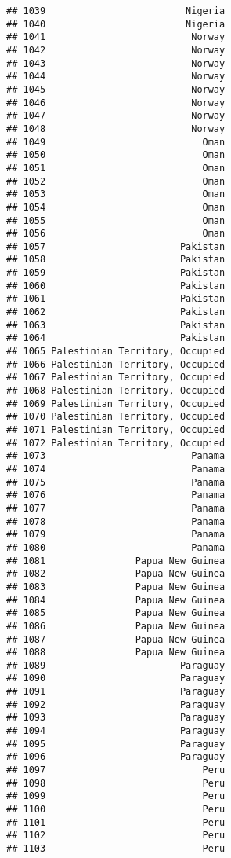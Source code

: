 \documentclass[]{article}
\begin{document}
\begin{verbatim}
## 1039                         Nigeria
## 1040                         Nigeria
## 1041                          Norway
## 1042                          Norway
## 1043                          Norway
## 1044                          Norway
## 1045                          Norway
## 1046                          Norway
## 1047                          Norway
## 1048                          Norway
## 1049                            Oman
## 1050                            Oman
## 1051                            Oman
## 1052                            Oman
## 1053                            Oman
## 1054                            Oman
## 1055                            Oman
## 1056                            Oman
## 1057                        Pakistan
## 1058                        Pakistan
## 1059                        Pakistan
## 1060                        Pakistan
## 1061                        Pakistan
## 1062                        Pakistan
## 1063                        Pakistan
## 1064                        Pakistan
## 1065 Palestinian Territory, Occupied
## 1066 Palestinian Territory, Occupied
## 1067 Palestinian Territory, Occupied
## 1068 Palestinian Territory, Occupied
## 1069 Palestinian Territory, Occupied
## 1070 Palestinian Territory, Occupied
## 1071 Palestinian Territory, Occupied
## 1072 Palestinian Territory, Occupied
## 1073                          Panama
## 1074                          Panama
## 1075                          Panama
## 1076                          Panama
## 1077                          Panama
## 1078                          Panama
## 1079                          Panama
## 1080                          Panama
## 1081                Papua New Guinea
## 1082                Papua New Guinea
## 1083                Papua New Guinea
## 1084                Papua New Guinea
## 1085                Papua New Guinea
## 1086                Papua New Guinea
## 1087                Papua New Guinea
## 1088                Papua New Guinea
## 1089                        Paraguay
## 1090                        Paraguay
## 1091                        Paraguay
## 1092                        Paraguay
## 1093                        Paraguay
## 1094                        Paraguay
## 1095                        Paraguay
## 1096                        Paraguay
## 1097                            Peru
## 1098                            Peru
## 1099                            Peru
## 1100                            Peru
## 1101                            Peru
## 1102                            Peru
## 1103                            Peru

\end{verbatim}
\end{document}
